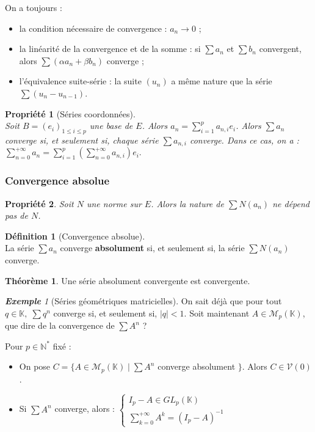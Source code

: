 \documentclass[12pt]{book}
\let\ensembleNombre\mathbb
\newcommand*\N{\ensuremath{\ensembleNombre{N}}}
\newcommand*\K{\ensuremath{\ensembleNombre{K}}}
\newtheorem*{prop}{Propriété}
\theoremstyle{definition}
\newtheorem*{defi}{Définition}
\newtheorem{thme}{Théorème}[chapter]
\theoremstyle{remark}
\newtheorem*{ex}{\textbf{Exemple}}
\newenvironment{fdef}
  {\begin{mdframed}[roundcorner=10pt, linewidth=1pt]\begin{defi}}
  {\end{defi}\end{mdframed}}
\newenvironment{fthme}
  {\begin{mdframed}[roundcorner=10pt, linewidth=2pt]\begin{thme}}
  {\end{thme}\end{mdframed}}
\begin{document}
	On a toujours :
	\begin{itemize}
	\item la condition nécessaire de convergence : $a_n \longrightarrow 0$ ; 
	\item la linéarité de la convergence et de la somme : si $\sum a_n$ et $\sum b_n$ convergent, alors $\sum (\alpha a_n + \beta b_n)$ converge ;
	\item l'équivalence suite-série : la suite $(u_n)$ a même nature que la série $\sum (u_n - u_{n-1})$.
	\end{itemize}
	
	\begin{prop}[Séries coordonnées]\mbox{~}\\
	Soit $B = (e_i)_{1 \leq i \leq p}$ une base de $E$. Alors $a_n = \sum_{i=1}^p a_{n,i} e_i$.  Alors $\sum a_n$ converge si, et seulement si, chaque série $\sum a_{n,i}$ converge. Dans ce cas, on a : $\sum_{n=0}^{+\infty} a_n = \sum_{i=1}^p \left( \sum_{n=0}^{+\infty} a_{n,i} \right) e_i.$
	\end{prop}
	
		\subsubsection{Convergence absolue}
	\begin{prop}
	Soit $N$ une norme sur $E$. Alors la nature de $\sum N(a_n)$ ne dépend pas de $N$.
	\end{prop}
	
	\begin{fdef}[Convergence absolue]\mbox{~}\\
	La série $\sum a_n$ converge \textbf{absolument} si, et seulement si, la série $\sum N(a_n)$ converge.
	\end{fdef}
	
	\begin{fthme}
	Une série absolument convergente est convergente.
	\end{fthme}
	
	\begin{ex}[Séries géométriques matricielles]
	On sait déjà que pour tout $q \in \K,\; \sum q^n$ converge si, et seulement si, $|q| < 1$. Soit maintenant $A \in \mathcal M_p(\K)$, que dire de la convergence de $\sum A^n$ ?
	
	Pour $p \in \N^*$ fixé :
	\begin{itemize}
	\item[1)] On pose $C = \lbrace A \in \mathcal M_p(\K) \;|\; \sum A^n$ converge absolument $\rbrace$. Alors $C \in \mathcal V(0)$.
	\item[2)] Si $\sum A^n$ converge, alors : $ \begin{cases}
												I_p - A \in GL_p(\K)\\
												\sum_{k=0}^{+\infty} A^k = (I_p - A)^{-1}
												\end{cases}$
	\end{itemize}
	\end{ex}
	
\end{document}
